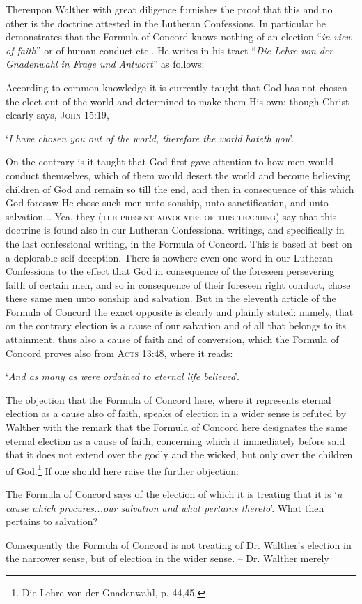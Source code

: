                 Thereupon Walther with great diligence furnishes the proof that this and no other is the doctrine attested in the Lutheran Confessions.  In particular he demonstrates that the Formula of Concord knows nothing of an election “\textit{in view of faith}” or of human conduct etc..  He writes in his tract “\textit{Die Lehre von der Gnadenwahl in Frage und Antwort}” as follows: \begin{fancyquotes}According to common knowledge it is currently taught that God has not chosen the elect out of the world and determined to make them His own; though Christ clearly says, {\scriptsize\textsc{John 15:19}},\begin{displayquote} ‘\textit{I have chosen you out of the world, therefore the world hateth you}’.\end{displayquote}  On the contrary is it taught that God first gave attention to how men would conduct themselves, which of them would desert the world and become believing children of God and remain so till the end, and then in consequence of this which God foresaw He chose such men unto sonship, unto sanctification, and unto salvation... Yea, they {\scriptsize\textsc{(the present advocates of this teaching)}} say that this doctrine is found also in our Lutheran Confessional writings, and specifically in the last confessional writing, in the Formula of Concord.  This is based at best on a deplorable self-deception.  There is nowhere even one word in our Lutheran Confessions to the effect that God in consequence of the foreseen persevering faith of certain men, and so in consequence of their foreseen right conduct, chose these same men unto sonship and salvation.  But in the eleventh article of the Formula of Concord the exact opposite is clearly and plainly stated: namely, that on the contrary election is a cause of our salvation and of all that belongs to its attainment, thus also a cause of faith and of conversion, which the Formula of Concord proves also from {\scriptsize\textsc{Acts 13:48}}, where it reads: \begin{displayquote}‘\textit{And as many as were ordained to eternal life believed}’.\end{displayquote}\end{fancyquotes}  The objection that the Formula of Concord here, where it represents eternal election as a cause also of faith, speaks of election in a wider sense is refuted by Walther with the remark that the Formula of Concord here designates the same eternal election as a cause of faith, concerning which it immediately before said that it does not extend over the godly and the wicked, but only over the children of God.\footnote{Die Lehre von der Gnadenwahl, p. 44,45.}  If one should here raise the further objection: \begin{displayquote}{\footnotesize The Formula of Concord says of the election of which it is treating that it is `\textit{a cause which procures...our salvation and what pertains thereto}’.  What then pertains to salvation?}\end{displayquote} Consequently the Formula of Concord is not treating of Dr. Walther’s election in the narrower sense, but of election in the wider sense. – Dr. Walther merely 